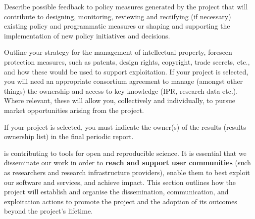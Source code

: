 \begin{draft}
Describe possible feedback to policy measures generated by the project that will
contribute to designing, monitoring, reviewing and rectifying (if necessary)
existing policy and programmatic measures or shaping and supporting the
implementation of new policy initiatives and decisions.
\begin{compactitem}
\item	Outline your strategy for the management of intellectual property, foreseen protection measures, such as patents, design rights, copyright, trade secrets, etc., and how these would be used to support exploitation.
	If your project is selected, you will need an appropriate consortium agreement
  to manage (amongst other things) the ownership and access to key knowledge
  (IPR, research data etc.). Where relevant, these will allow you, collectively
  and individually, to pursue market opportunities arising from the project.
\item If your project is selected, you must indicate the owner(s) of the results (results ownership list) in the final periodic report.
\end{compactitem}
\end{draft}


\TheProject is contributing to tools for open and reproducible science. It is
essential that we disseminate our work in order to \textbf{reach and support user
communities} (such as researchers and research infrastructure providers), enable
them to best exploit our software and services, and achieve impact.
This section outlines how the project will establish and organise the
dissemination, communication, and exploitation actions to promote the project
and the adoption of its outcomes beyond the project's lifetime.



